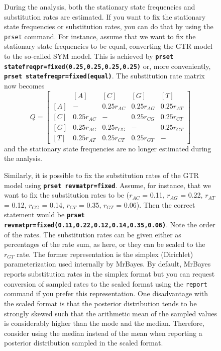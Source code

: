 \documentclass[12pt]{book}
\newcommand{\ttt}[1]{\texttt{#1}}
\newcommand{\tb}[1]{\ttt{\textbf{#1}}}
\begin{document}
\begin{figure}[h]
During the analysis, both the stationary state frequencies and substitution rates are estimated. If
you want to fix the stationary state frequencies or substitution rates, you can do that by using
the \ttt{prset} command. For instance, assume that we want to fix the stationary state frequencies
to be equal, converting the GTR model to the so-called SYM model. This is achieved by \tb{prset
statefreqpr=fixed(0.25,0.25,0.25,0.25)} or, more conveniently, \tb{prset statefreqpr=fixed(equal)}.
The substitution rate matrix now becomes
\[ Q=\begin{bmatrix}
    & [A] & [C] & [G] & [T]\\
 [A]& - & 0.25 r_{AC} & 0.25 r_{AG} & 0.25 r_{AT}\\
 [C]& 0.25 r_{AC} & - & 0.25 r_{CG} &0.25 r_{CT}\\
 [G]& 0.25 r_{AG} & 0.25 r_{CG}& - & 0.25 r_{GT}\\
 [T]& 0.25 r_{AT} & 0.25 r_{CT}&0.25 r_{GT} & -
\end{bmatrix}
\]
and the stationary state frequencies are no longer estimated during the analysis.

Similarly, it is possible to fix the substitution rates of the GTR model using \tb{prset
revmatpr=fixed}. Assume, for instance, that we want to fix the substitution rates to be ($r_{AC}$ =
0.11, $r_{AG}$ = 0.22, $r_{AT}$ = 0.12, $r_{CG}$ = 0.14, $r_{CT}$ = 0.35, $r_{GT}$ = 0.06). Then
the correct statement would be \tb{prset revmatpr=fixed(0.11,0.22,0.12,0.14,0.35,0.06)}. Note the
order of the rates. The substitution rates can be given either as percentages of the rate sum, as
here, or they can be scaled to the $r_{GT}$ rate. The former representation is the simplex
(Dirichlet) parameterization used internally by MrBayes. By default, MrBayes reports substitution
rates in the simplex format but you can request conversion of sampled rates to the scaled format
using the \ttt{report} command if you prefer this representation. One disadvantage with the scaled
format is that the posterior distribution tends to be strongly skewed such that the arithmetic mean
of the sampled values is considerably higher than the mode and the median. Therefore, consider
using the median instead of the mean when reporting a posterior distribution sampled in the scaled
format.


\end{figure}
\end{document}
